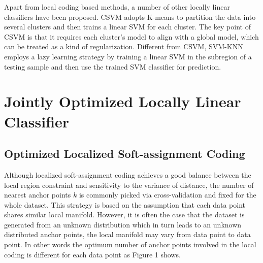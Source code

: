 \documentclass{llncs}
\begin{document}
	Apart from local coding based methods, a number of other locally linear classifiers have been proposed. CSVM \cite{16} adopts K-means to partition the data into several clusters and then trains a linear SVM for each cluster. The key point of CSVM is that it requires each cluster's model to align with a global model, which can be treated as a kind of regularization. Different from CSVM, SVM-KNN \cite{17} employs a lazy learning strategy by training a linear SVM in the subregion of a testing sample and then use the trained SVM classifier for prediction.
	\section{Jointly Optimized Locally Linear Classifier}
	\subsection{Optimized Localized Soft-assignment Coding}
	Although localized soft-assignment coding  achieves a good balance between the local region constraint and sensitivity to the variance of distance, the number of nearest anchor points $k$ is commonly picked via cross-validation and fixed for the whole dataset. This strategy is based on the assumption that each data point shares similar local manifold. However, it is often the case that the dataset is generated from an unknown distribution which in turn leads to an unknown distributed anchor points, the local manifold may vary from data point to data point. In other words the optimum number of anchor points involved in the local coding is different for each data point as Figure 1 shows.
\end{document}
